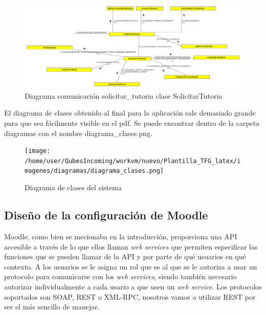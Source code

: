 \begin{figure}[H] %
\centering
\includegraphics[scale=0.2]{imagenes/diagramas/comunicacion/solicitar_tutoria_tutoria.png}  %

\caption{Diagrama comunicación solicitar\_tutoria clase  SolicitarTutoria}\label{figura112}
\end{figure}

El diagrama de clases obtenido al final para la aplicación sale demasiado grande para que sea fácilmente visible en el pdf. Se puede encontrar dentro de la carpeta diagramas con el nombre diagrama\_clases.png.

 \begin{figure}[H] %
\texttt{[image: /home/user/QubesIncoming/workvm/nuevo/Plantilla\_TFG\_latex/imagenes/diagramas/diagrama\_clases.png]}  %
\caption{Diagrama de clases del sistema}\label{figura10101}
\end{figure}
\subsection{Diseño de la configuración de Moodle}

Moodle, como bien se mecionaba en la introducción, proporciona una API accesible a través de lo que ellos llaman \textit{web services}  que permiten especificar las funciones que se pueden llamar de la API y por parte de qué usuarios en qué contexto. A los usuarios se le asigna un rol que es al que se le autoriza a usar un protocolo para comunicarse con los \textit{web services}, siendo también necesario autorizar individualmente a cada usario a que usen un \textit{web service}.  Los protocolos soportados son SOAP, REST o XML-RPC, nosotros vamos a utilizar REST por ser el más sencillo de manejar.
\par

